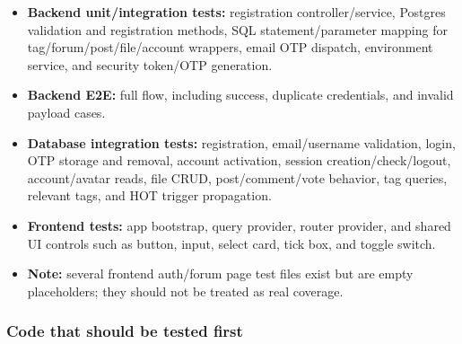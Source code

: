 \documentclass[12pt]{article}
\begin{document}
\begin{itemize}

\item \textbf{Backend unit/integration tests:} registration controller/service, Postgres validation and registration methods, SQL statement/parameter mapping for tag/forum/post/file/account wrappers, email OTP dispatch, environment service, and security token/OTP generation.

\item \textbf{Backend E2E:} full \texttt{} flow, including success, duplicate credentials, and invalid payload cases.

\item \textbf{Database integration tests:} registration, email/username validation, login, OTP storage and removal, account activation, session creation/check/logout, account/avatar reads, file CRUD, post/comment/vote behavior, tag queries, relevant tags, and HOT trigger propagation.

\item \textbf{Frontend tests:} app bootstrap, query provider, router provider, and shared UI controls such as button, input, select card, tick box, and toggle switch.

\item \textbf{Note:} several frontend auth/forum page test files exist but are empty placeholders; they should not be treated as real coverage.

\end{itemize}

\subsubsection{Code that should be tested first}
\end{document}
